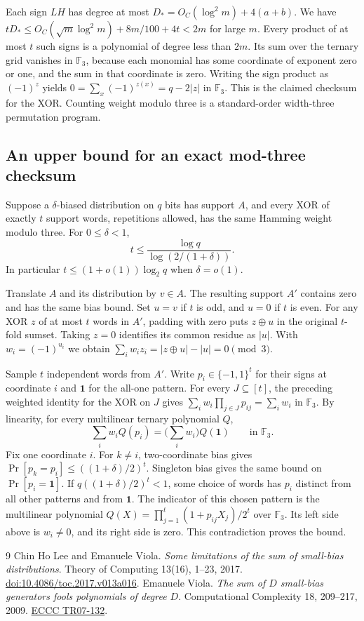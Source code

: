 \documentclass[11pt]{article}
\begin{document}
Each sign $LH$ has degree at most $D_*=O_C(\log^2 m)+4(a+b)$.
We have $tD_*\le O_C(\sqrt m\log^2m)+8m/100+4t<2m$ for large
$m$. Every product of at most $t$ such signs is a polynomial of
degree less than $2m$. Its sum over the ternary grid vanishes in
$\mathbb F_3$, because each monomial has some coordinate of
exponent zero or one, and the sum in that coordinate is zero.
Writing the sign product as $(-1)^z$ yields
$0=\sum_x(-1)^{z(x)}=q-2|z|$ in $\mathbb F_3$. This is the
claimed checksum for the XOR. Counting weight modulo three is a
standard-order width-three permutation program.

\subsection{An upper bound for an exact mod-three checksum}
Suppose a $\delta$-biased distribution on $q$ bits has support $A$, and
every XOR of exactly $t$ support words, repetitions allowed, has the same
Hamming weight modulo three. For $0\le\delta<1$,
\[
               t\le \frac{\log q}{\log(2/(1+\delta))}.
\]
In particular $t\le(1+o(1))\log_2 q$ when $\delta=o(1)$.

Translate $A$ and its distribution by $v\in A$. The resulting
support $A'$ contains zero and has the same bias bound. Set $u=v$
if $t$ is odd, and $u=0$ if $t$ is even. For any XOR $z$ of at most
$t$ words in $A'$, padding with zero puts $z\oplus u$ in the original
$t$-fold sumset. Taking $z=0$ identifies its common residue as $|u|$.
With $w_i=(-1)^{u_i}$ we obtain
$\sum_i w_i z_i= |z\oplus u|-|u|=0\pmod 3$.

Sample $t$ independent words from $A'$. Write $p_i\in\{-1,1\}^t$
for their signs at coordinate $i$ and $\mathbf{1}$ for the all-one
pattern. For every $J\subseteq[t]$, the preceding weighted identity
for the XOR on $J$ gives
$\sum_i w_i\prod_{j\in J}p_{ij}=\sum_i w_i$ in $\mathbb F_3$.
By linearity, for every multilinear ternary polynomial $Q$,
\[
       \sum_i w_i Q(p_i)=\Big(\sum_i w_i\Big)Q(\mathbf{1})
                     \qquad\text{in }\mathbb F_3.
\]
Fix one coordinate $i$. For $k\ne i$, two-coordinate bias gives
$\Pr[p_k=p_i]\le((1+\delta)/2)^t$. Singleton bias gives the same
bound on $\Pr[p_i=\mathbf{1}]$. If $q((1+\delta)/2)^t<1$, some
choice of words has $p_i$ distinct from all other patterns and from
$\mathbf{1}$. The indicator of this chosen pattern is the multilinear
polynomial $Q(X)=\prod_{j=1}^t(1+p_{ij}X_j)/2^t$ over $\mathbb F_3$.
Its left side above is $w_i\ne0$, and its right side is zero.
This contradiction proves the bound.

\begin{thebibliography}{9}
 Chin Ho Lee and Emanuele Viola.
\emph{Some limitations of the sum of small-bias distributions}.
Theory of Computing 13(16), 1--23, 2017.
\href{https://doi.org/10.4086/toc.2017.v013a016}{doi:10.4086/toc.2017.v013a016}.
 Emanuele Viola.
\emph{The sum of $D$ small-bias generators fools polynomials of degree $D$}.
Computational Complexity 18, 209--217, 2009.
\href{https://eccc.weizmann.ac.il/report/2007/132/}{ECCC TR07-132}.
\end{thebibliography}
\end{document}
